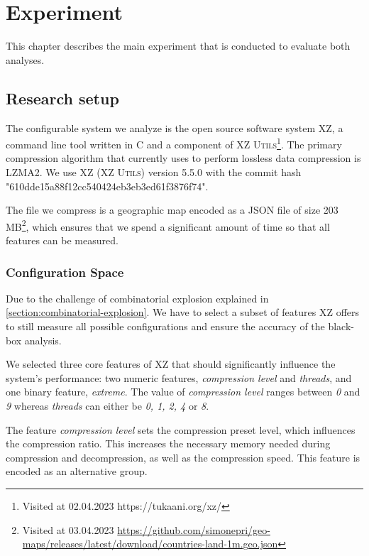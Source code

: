 \chapter{Experiment}\label{ch:experiment}

This chapter describes the main experiment that is conducted to evaluate both analyses.

\section{Research setup}\label{ch:Research-setup}

The configurable system we analyze is the open source software system \textsc{XZ}, a command line tool written in \textsc{C} and a component of
\textsc{XZ Utils}\footnote{Visited at 02.04.2023 https://tukaani.org/xz/}.  
The primary compression algorithm that  currently uses to perform lossless data compression is LZMA2.
We use \textsc{XZ} \textsc{(XZ Utils)} version 5.5.0 with the commit hash "610dde15a88f12cc540424eb3eb3ed61f3876f74".

The file we compress is a geographic map encoded as a \textsc{JSON} file of size 203 MB\footnote{Visited at 03.04.2023 \url{https://github.com/simonepri/geo-maps/releases/latest/download/countries-land-1m.geo.json}},
which ensures that we spend a significant amount of time so that all features can be measured.

\subsection{Configuration Space}
Due to the challenge of combinatorial explosion explained in \autoref{section:combinatorial-explosion}.
We have to select a subset of features \textsc{XZ} offers to still measure all possible configurations and ensure the accuracy of the black-box analysis. 

We selected three core features of \textsc{XZ} that should significantly influence the system's performance: 
two numeric features, \emph{compression level} and \emph{threads}, and one binary feature, \emph{extreme}. 
The value of \emph{compression level} ranges between \emph{0} and \emph{9} whereas \emph{threads} can either be \emph{0, 1, 2, 4} or \emph{8}. 

The feature \emph{compression level} sets the compression preset level, which influences the compression ratio.
This increases the necessary memory needed during compression and decompression, as well as the compression speed. 
This feature is encoded as an alternative group.

